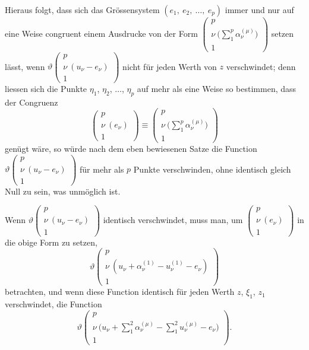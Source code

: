 \documentclass[12pt,a4paper]{book}
\theoremstyle{definition}
\theoremstyle{remark}
\begin{document}
Hieraus folgt, dass sich das Grössensystem $(e_1,\ e_2,\ \ldots,\ e_p)$ immer und nur auf eine Weise congruent einem Ausdrucke von der Form $\left(\begin{array}{c} p\\ \nu\ \bigl(\sum\limits_1^p \alpha_\nu^{(\mu)}\bigr)\\ 1 \end{array}\right)$ setzen lässt, wenn $\vartheta\left(\begin{array}{c} p\\ \nu\ (u_\nu - e_\nu)\\ 1 \end{array}\right)$ nicht für jeden Werth von $z$ verschwindet; denn liessen sich die Punkte $\eta_1$, $\eta_2$, $\ldots$, $\eta_p$ auf mehr als eine Weise so bestimmen, dass der Congruenz
\[ \left(\begin{array}{c} p\\ \nu\ (e_\nu)\\ 1 \end{array}\right) \equiv \left(\begin{array}{c} p\\ \nu\ \bigl(\sum\limits_1^p \alpha_\nu^{(\mu)}\bigr)\\ 1 \end{array}\right) \]
genügt wäre, so würde nach dem eben bewiesenen Satze die Function $\vartheta\left(\begin{array}{c} p\\ \nu\ (u_\nu - e_\nu)\\ 1 \end{array}\right)$ für mehr als $p$ Punkte verschwinden, ohne identisch gleich Null zu sein, was unmöglich ist.

Wenn $\vartheta\left(\begin{array}{c} p\\ \nu\ (u_\nu - e_\nu)\\ 1 \end{array}\right)$ identisch verschwindet, muss man, um $\left(\begin{array}{c} p\\ \nu\ (e_\nu)\\ 1 \end{array}\right)$ in die obige Form zu setzen,
\[ \vartheta\left(\begin{array}{c} p\\ \nu\ (u_\nu + \alpha_\nu^{(1)} - u_\nu^{(1)} - e_\nu)\\ 1 \end{array}\right) \]
betrachten, und wenn diese Function identisch für jeden Werth $z$, $\xi_1$, $z_1$ verschwindet, die Function
\[ \vartheta\left(\begin{array}{c} p\\ \nu\ \bigl(u_\nu + \sum\limits_1^2 \alpha_\nu^{(\mu)} - \sum\limits_1^2 u_\nu^{(\mu)} - e_\nu\bigr)\\ 1 \end{array}\right). \]
\end{document}
